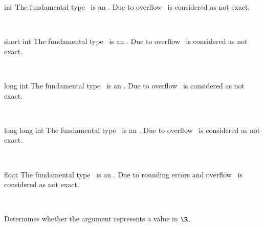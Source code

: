 \ccDefGlobalScope{}

\begin{ccRefClass}{int}
\ccDefinition
The fundamental type \ccRefName\ is an  . 
Due to overflow \ccRefName\ is considered as not exact. 

\ccIsModel
{}\\
\end{ccRefClass}


\begin{ccRefClass}{short int}
\ccDefinition
The fundamental type \ccRefName\ is an  
. Due to overflow \ccRefName\ is considered as not exact.
 
\ccIsModel
{}\\
\end{ccRefClass}

\begin{ccRefClass}{long int}
\ccDefinition
The fundamental type \ccRefName\ is an  
. Due to overflow \ccRefName\ is considered as not exact. 

\ccIsModel
{}\\
\end{ccRefClass}


\begin{ccRefClass}{long long int}
\ccDefinition
The fundamental type \ccRefName\ is an  
. Due to overflow \ccRefName\ is considered as not exact.
 
\ccIsModel
{}\\
\end{ccRefClass}


\begin{ccRefClass}{float}
\ccDefinition
The fundamental type \ccRefName\ is an  
. Due to rounding errors and overflow \ccRefName\ is 
considered as not exact.
 
\ccIsModel
{}\\

\ccQueryFunctions
{}
        { Determines whether the argument represents a value in $\R$. }
\end{ccRefClass}


